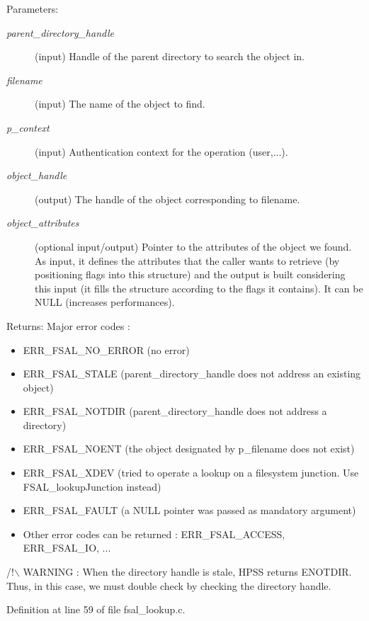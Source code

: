 \begin{Desc}
\item[Parameters:]
\begin{description}
\item[{\em parent\_\-directory\_\-handle}](input) Handle of the parent directory to search the object in. \item[{\em filename}](input) The name of the object to find. \item[{\em p\_\-context}](input) Authentication context for the operation (user,...). \item[{\em object\_\-handle}](output) The handle of the object corresponding to filename. \item[{\em object\_\-attributes}](optional input/output) Pointer to the attributes of the object we found. As input, it defines the attributes that the caller wants to retrieve (by positioning flags into this structure) and the output is built considering this input (it fills the structure according to the flags it contains). It can be NULL (increases performances).\end{description}
\end{Desc}
\begin{Desc}
\item[Returns:]Major error codes :\begin{itemize}
\item ERR\_\-FSAL\_\-NO\_\-ERROR (no error)\item ERR\_\-FSAL\_\-STALE (parent\_\-directory\_\-handle does not address an existing object)\item ERR\_\-FSAL\_\-NOTDIR (parent\_\-directory\_\-handle does not address a directory)\item ERR\_\-FSAL\_\-NOENT (the object designated by p\_\-filename does not exist)\item ERR\_\-FSAL\_\-XDEV (tried to operate a lookup on a filesystem junction. Use FSAL\_\-lookupJunction instead)\item ERR\_\-FSAL\_\-FAULT (a NULL pointer was passed as mandatory argument)\item Other error codes can be returned : ERR\_\-FSAL\_\-ACCESS, ERR\_\-FSAL\_\-IO, ... \end{itemize}
\end{Desc}


/!$\backslash$ WARNING : When the directory handle is stale, HPSS returns ENOTDIR. Thus, in this case, we must double check by checking the directory handle. 

Definition at line 59 of file fsal\_\-lookup.c.

